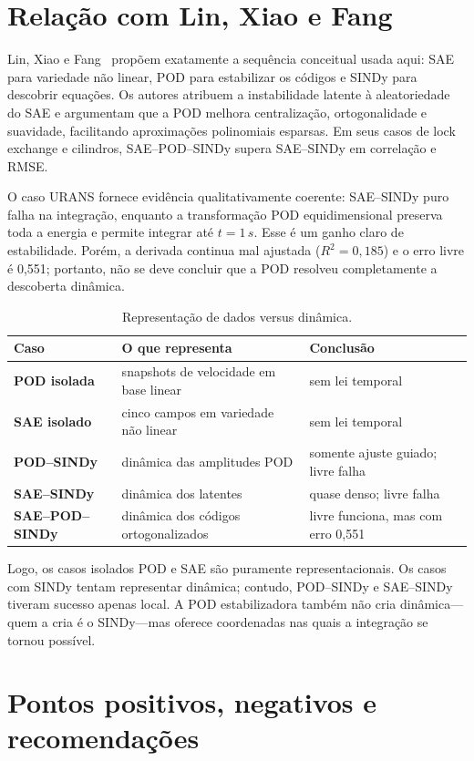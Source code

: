 \documentclass[12pt,a4paper]{article}
\begin{document}
\section{Relação com Lin, Xiao e Fang}
Lin, Xiao e Fang~\cite{lin2024} propõem exatamente a sequência conceitual usada aqui: SAE para variedade não linear, POD para estabilizar os códigos e SINDy para descobrir equações. Os autores atribuem a instabilidade latente à aleatoriedade do SAE e argumentam que a POD melhora centralização, ortogonalidade e suavidade, facilitando aproximações polinomiais esparsas. Em seus casos de lock exchange e cilindros, SAE--POD--SINDy supera SAE--SINDy em correlação e RMSE.

O caso URANS fornece evidência qualitativamente coerente: SAE--SINDy puro falha na integração, enquanto a transformação POD equidimensional preserva toda a energia e permite integrar até $t=1\,\si{s}$. Esse é um ganho claro de estabilidade. Porém, a derivada continua mal ajustada ($R^2=0,185$) e o erro livre é 0,551; portanto, não se deve concluir que a POD resolveu completamente a descoberta dinâmica.

\begin{table}[H]\centering
\caption{Representação de dados versus dinâmica.}\label{tab:repdyn}
\begin{tabularx}{\textwidth}{>{\bfseries}l X X}
\toprule Caso & O que representa & Conclusão\\\midrule
POD isolada & snapshots de velocidade em base linear & sem lei temporal\\
SAE isolado & cinco campos em variedade não linear & sem lei temporal\\
POD--SINDy & dinâmica das amplitudes POD & somente ajuste guiado; livre falha\\
SAE--SINDy & dinâmica dos latentes & quase denso; livre falha\\
SAE--POD--SINDy & dinâmica dos códigos ortogonalizados & livre funciona, mas com erro 0,551\\
\bottomrule\end{tabularx}\end{table}

Logo, os casos isolados POD e SAE são puramente representacionais. Os casos com SINDy tentam representar dinâmica; contudo, POD--SINDy e SAE--SINDy tiveram sucesso apenas local. A POD estabilizadora também não cria dinâmica---quem a cria é o SINDy---mas oferece coordenadas nas quais a integração se tornou possível.

\section{Pontos positivos, negativos e recomendações}
\end{document}
